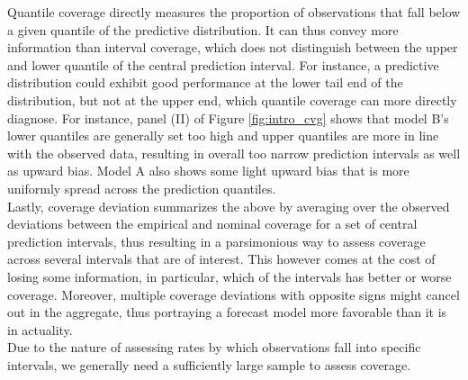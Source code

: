 Quantile coverage directly measures the proportion of observations that fall below a given quantile of the predictive distribution. It can thus convey more information than interval coverage, which does not distinguish between the upper and lower quantile of the central prediction interval. For instance, a predictive distribution could exhibit good performance at the lower tail end of the distribution, but not at the upper end, which quantile coverage can more directly diagnose. For instance, panel (II) of Figure \ref{fig:intro_cvg} shows that model B's lower quantiles are generally set too high and upper quantiles are more in line with the observed data, resulting in overall too narrow prediction intervals as well as upward bias. Model A also shows some light upward bias that is more uniformly spread across the prediction quantiles. \medskip \\
Lastly, coverage deviation summarizes the above by averaging over the observed deviations between the empirical and nominal coverage for a set of central prediction intervals, thus resulting in a parsimonious way to assess coverage across several intervals that are of interest. This however comes at the cost of losing some information, in particular, which of the intervals has better or worse coverage. Moreover, multiple coverage deviations with opposite signs might cancel out in the aggregate, thus portraying a forecast model more favorable than it is in actuality.\\   
Due to the nature of assessing rates by which observations fall into specific intervals, we generally need a sufficiently large sample to assess coverage. \\

